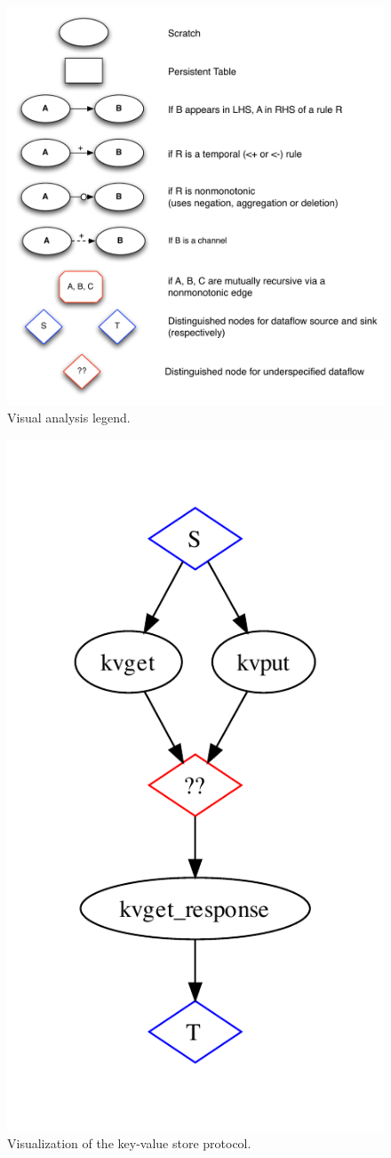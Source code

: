 \begin{figure}[t]
\centering
\includegraphics[width=1.1\linewidth]{fig/mittalk_legend.pdf}
\vspace{-10pt}
\caption{Visual analysis legend.}
\label{fig:analysis-legend}
\vspace{-2pt}
\end{figure}

\begin{figure}[t]
\centering
\includegraphics[width=0.4\linewidth]{fig/kvs_proto_pdg.pdf}
\vspace{-10pt}
\caption{Visualization of the key-value store protocol.}
\label{fig:pdg-kvs-proto-analysis}
\vspace{-2pt}
\end{figure}

